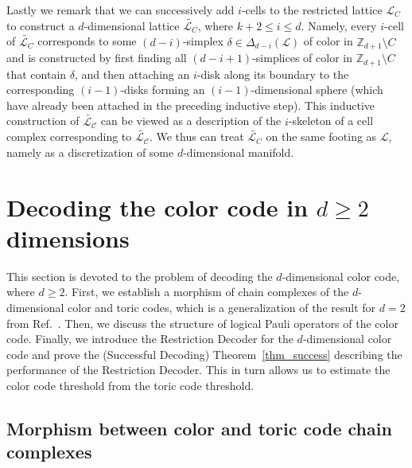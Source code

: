 \documentclass[onecolumn,letterpaper,11pt,accepted=2022-12-19]{quantumarticle}
\newcommand{\face}[2]{{\Delta_{#1}(#2)}}
\theoremstyle{definition}
\theoremstyle{lemma}
\theoremstyle{theorem}
\theoremstyle{corollary}
\begin{document}
{Lastly we remark that we can successively add $i$-cells to the restricted lattice $\mathcal{L}_C$ to construct a $d$-dimensional lattice $\widetilde{\mathcal{L}_C}$, where $k+2\leq i \leq d$.
Namely, every $i$-cell of $\widetilde{\mathcal{L}_C}$ corresponds to some $(d-i)$-simplex $\delta\in\face {d-i}{\mathcal{L}}$ of color in $\mathbb{Z}_{d+1} \setminus C$ and is constructed by first finding all $(d-i+1)$-simplices of color in $\mathbb{Z}_{d+1}\setminus C$ that contain $\delta$, and then attaching an $i$-disk along its boundary to the corresponding $(i-1)$-disks forming an $(i-1)$-dimensional sphere (which have already been attached in the preceding inductive step).
This inductive construction of $\widetilde{\mathcal{L_C}}$ can be viewed as a description of the $i$-skeleton of a cell complex corresponding to $\widetilde{\mathcal{L_C}}$.
We thus can treat $\widetilde{\mathcal{L}_C}$ on the same footing as $\mathcal{L}$, namely as a discretization of some $d$-dimensional manifold.


\section{Decoding the color code in $d\geq 2$ dimensions}  
\label{sec_decoding}


This section is devoted to the problem of decoding the $d$-dimensional color code, where $d\geq 2$.
First, we establish a morphism of chain complexes of the $d$-dimensional color and toric codes, which is a generalization of the result for $d=2$ from Ref.~\cite{Delfosse2014}.
Then, we discuss the structure of logical Pauli operators of the color code.
Finally, we introduce the Restriction Decoder for the $d$-dimensional color code and prove the (Successful Decoding) Theorem~\ref{thm_success} describing the performance of the Restriction Decoder. 
This in turn allows us to estimate the color code threshold from the toric code threshold.


\subsection{Morphism between color and toric code chain complexes}


}
\end{document}
